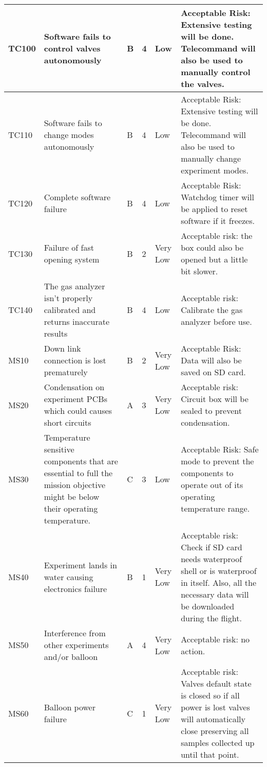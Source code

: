 \begin{longtable}{|m{}| m{} |m{} |m{}|m{}| m{}|}
TC100 & Software fails to control valves autonomously & B & 4 & \cellcolor[HTML]{FCFF2F}Low & Acceptable Risk: Extensive testing will be done. Telecommand will also be used to manually control the valves. \\ \hline
TC110 & Software fails to change modes autonomously & B & 4 & \cellcolor[HTML]{FCFF2F}Low & Acceptable Risk: Extensive testing will be done. Telecommand will also be used to manually change experiment modes. \\ \hline
TC120 & Complete software failure & B & 4 & \cellcolor[HTML]{FCFF2F}Low & Acceptable Risk: Watchdog timer will be applied to reset software if it freezes. \\ \hline
TC130 & Failure of fast opening system & B & 2 & \cellcolor[HTML]{34FF34}Very Low & Acceptable risk: the box could also be opened but a little bit slower. \\ \hline
TC140 & The gas analyzer isn't properly calibrated and returns inaccurate results & B & 4 & \cellcolor[HTML]{FCFF2F}Low & Acceptable risk: Calibrate the gas analyzer before use.\\ \hline
MS10 & Down link connection is lost prematurely & B & 2 & \cellcolor[HTML]{34FF34}Very Low & Acceptable Risk: Data will also be saved on SD card. \\ \hline
MS20 & Condensation on experiment PCBs which could causes short circuits & A & 3 & \cellcolor[HTML]{34FF34}Very Low & Acceptable risk: Circuit box will be sealed to prevent condensation. \\ \hline
MS30 & Temperature sensitive components that are essential to full the mission objective might be below their operating temperature. & C & 3 & \cellcolor[HTML]{FCFF2F}Low & Acceptable Risk: Safe mode to prevent the components to operate out of its operating temperature range. \\ \hline
MS40 & Experiment lands in water causing electronics failure & B & 1 & \cellcolor[HTML]{34FF34}Very Low & Acceptable risk: Check if SD card needs waterproof shell or is waterproof in itself. Also, all the necessary data will be downloaded during the flight. \\ \hline
MS50 & Interference from other experiments and/or balloon & A & 4 & \cellcolor[HTML]{34FF34}Very Low & Acceptable risk: no action. \\ \hline
MS60 & Balloon power failure & C & 1 & \cellcolor[HTML]{34FF34}Very Low & Acceptable risk: Valves default state is closed so if all power is lost valves will automatically close preserving all samples collected up until that point. \\ \hline

\end{longtable}
